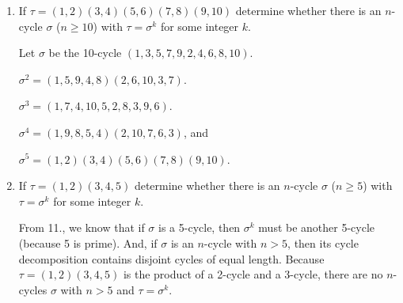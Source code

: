 \documentclass{article}
\begin{document}
\begin{enumerate}[label=(\alph*)]
    \item If $\tau = (1, 2)(3, 4)(5, 6)(7, 8)(9, 10)$ determine whether there is an $n$-cycle $\sigma$ ($n \geq 10$) with $\tau = \sigma^k$ for some integer $k$.

          Let $\sigma$ be the 10-cycle $(1, 3, 5, 7, 9, 2, 4, 6, 8, 10)$.

          $\sigma^2 = (1, 5, 9, 4, 8)(2, 6, 10, 3, 7)$.

          $\sigma^3 = (1, 7, 4, 10, 5, 2, 8, 3, 9, 6)$.

          $\sigma^4 = (1, 9, 8, 5, 4)(2, 10, 7, 6, 3)$, and

          $\sigma^5 = (1, 2)(3, 4)(5, 6)(7, 8)(9, 10)$.
    \item If $\tau = (1, 2)(3, 4, 5)$ determine whether there is an $n$-cycle $\sigma$ ($n \geq 5$) with $\tau = \sigma^k$ for some integer $k$.

          From 11., we know that if $\sigma$ is a 5-cycle, then $\sigma^k$ must be another 5-cycle (because 5 is prime). And, if $\sigma$ is an $n$-cycle with $n > 5$, then its cycle decomposition contains disjoint cycles of equal length. Because $\tau = (1, 2)(3, 4, 5)$ is the product of a 2-cycle and a 3-cycle, there are no $n$-cycles $\sigma$ with $n > 5$ and $\tau = \sigma^k$.
\end{enumerate}
\end{document}
